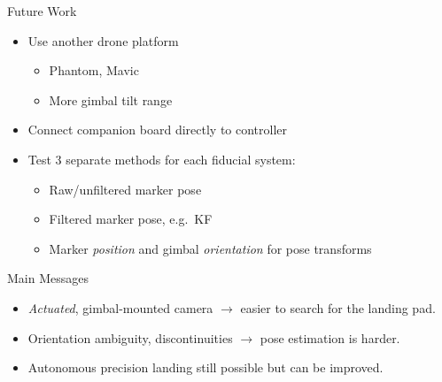 \documentclass[aspectratio=169]{beamer}
\newif\ifpause
\newcommand{\mypause}{\ifpause \pause \fi}
\begin{document}
\begin{frame}{Future Work}
	\begin{itemize}
		\item Use another drone platform
		\begin{itemize}
			\item Phantom, Mavic
			\item More gimbal tilt range
		\end{itemize}
		\item Connect companion board directly to controller
		\item Test 3 separate methods for each fiducial system:
		\begin{itemize}
			\item Raw/unfiltered marker pose
			\item Filtered marker pose, e.g.~KF
			\item Marker \emph{position} and gimbal \emph{orientation} for pose transforms
		\end{itemize}
	\end{itemize}
\end{frame}

\begin{frame}{Main Messages}
	\begin{itemize}
		\item \emph{Actuated}, gimbal-mounted camera
			\mypause $\rightarrow$ easier to search for the landing pad.
		\mypause\item Orientation ambiguity, discontinuities
			\mypause $\rightarrow$ pose estimation is harder.
		\mypause\item Autonomous precision landing still possible
			\mypause but can be improved.
	\end{itemize}
\end{frame}


\end{document}
